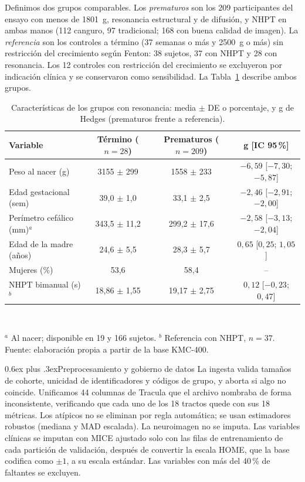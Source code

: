 \documentclass[conference,letterpaper,10pt]{IEEEtran}
\makeatletter
\def\subsection{\@startsection{subsection}{2}{\z@}{1.5ex plus 1ex minus .5ex}%
  {0.6ex plus .3ex}{\normalfont\normalsize\bfseries}}
\makeatother
\begin{document}
Definimos dos grupos comparables. Los \emph{prematuros} son los 209 participantes del ensayo con menos de 1801~g, resonancia estructural y de difusión, y NHPT en ambas manos (112 canguro, 97 tradicional; 168 con buena calidad de imagen). La \emph{referencia} son los controles a término (37 semanas o más y 2500~g o más) sin restricción del crecimiento según Fenton: 38 sujetos, 37 con NHPT y 28 con resonancia. Los 12 controles con restricción del crecimiento se excluyeron por indicación clínica y se conservaron como sensibilidad. La Tabla~\ref{tab:grupos} describe ambos grupos.

\begin{table}[t]
\caption{Características de los grupos con resonancia: media $\pm$ DE o porcentaje, y g de Hedges (prematuros frente a referencia).}
\label{tab:grupos}
\centering
\footnotesize
\setlength{\tabcolsep}{8pt}
\begin{tabular}{@{}lccc@{}}
\toprule
Variable & Término ($n=28$) & Prematuros ($n=209$) & g [IC 95\,\%] \\
\midrule
Peso al nacer (g) & 3155 $\pm$ 299 & 1558 $\pm$ 233 & $-6{,}59$ [$-7{,}30$; $-5{,}87$] \\
Edad gestacional (sem) & 39,0 $\pm$ 1,0 & 33,1 $\pm$ 2,5 & $-2{,}46$ [$-2{,}91$; $-2{,}00$] \\
Perímetro cefálico (mm)$^a$ & 343,5 $\pm$ 11,2 & 299,2 $\pm$ 17,6 & $-2{,}58$ [$-3{,}13$; $-2{,}04$] \\
Edad de la madre (años) & 24,6 $\pm$ 5,5 & 28,3 $\pm$ 5,7 & $0{,}65$ [$0{,}25$; $1{,}05$] \\
Mujeres (\%) & 53,6 & 58,4 & -- \\
NHPT bimanual (s)$^b$ & 18,86 $\pm$ 1,55 & 19,17 $\pm$ 2,75 & $0{,}12$ [$-0{,}23$; $0{,}47$] \\
\bottomrule
\end{tabular}\\[2pt]
\parbox{0.75\textwidth}{\scriptsize $^a$ Al nacer; disponible en 19 y 166 sujetos. $^b$ Referencia con NHPT, $n=37$. Fuente: elaboración propia a partir de la base KMC-400.}
\end{table}

\subsection{Preprocesamiento y gobierno de datos}
La ingesta valida tamaños de cohorte, unicidad de identificadores y códigos de grupo, y aborta si algo no coincide. Unificamos 44 columnas de Tracula que el archivo nombraba de forma inconsistente, verificando que cada uno de los 18 tractos quede con sus 18 métricas. Los atípicos no se eliminan por regla automática; se usan estimadores robustos (mediana y MAD escalada). La neuroimagen no se imputa. Las variables clínicas se imputan con MICE \cite{vanbuuren2011} ajustado solo con las filas de entrenamiento de cada partición de validación, después de convertir la escala HOME, que la base codifica como $\pm 1$, a su escala estándar. Las variables con más del 40\,\% de faltantes se excluyen.
\end{document}
